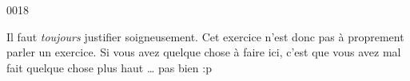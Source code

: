 
\begin{corrige}{0018}

Il faut \emph{toujours} justifier soigneusement. Cet exercice n'est donc pas à proprement parler un exercice. Si vous avez quelque chose à faire ici, c'est que vous avez mal fait quelque chose plus haut \ldots{} pas bien :p

\end{corrige}
